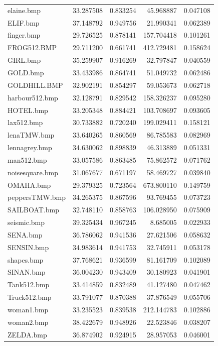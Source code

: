 \documentclass{article}
\begin{document}
\begin{table}[H]
\begin{tabular}{@{}lrrrr@{}}
    elaine.bmp         & 33.287508 & 0.833254 & 45.968887  & 0.047108 \\
    ELIF.bmp           & 37.148792 & 0.949756 & 21.990341  & 0.062389 \\
    finger.bmp         & 29.726525 & 0.878141 & 157.704418 & 0.101261 \\
    FROG512.BMP        & 29.711200 & 0.661741 & 412.729481 & 0.158624 \\
    GIRL.bmp           & 35.259907 & 0.916269 & 32.797847  & 0.040559 \\
    GOLD.bmp           & 33.433986 & 0.864741 & 51.049732  & 0.062486 \\
    GOLDHILL.BMP       & 32.902191 & 0.854297 & 59.053673  & 0.062718 \\
    harbour512.bmp     & 32.128791 & 0.829542 & 158.326237 & 0.095280 \\
    HOTEL.bmp          & 33.205348 & 0.884421 & 103.708697 & 0.093605 \\
    lax512.bmp         & 30.733882 & 0.720240 & 199.029411 & 0.158121 \\
    lenaTMW.bmp        & 33.640265 & 0.860569 & 86.785583  & 0.082969 \\
    lennagrey.bmp      & 34.630062 & 0.898839 & 46.313889  & 0.051331 \\
    man512.bmp         & 33.057586 & 0.863485 & 75.862572  & 0.071762 \\
    noisesquare.bmp    & 31.067677 & 0.671197 & 58.469727  & 0.039840 \\
    OMAHA.bmp          & 29.379325 & 0.723564 & 673.800110 & 0.149759 \\
    peppersTMW.bmp     & 34.265375 & 0.867596 & 93.769455  & 0.073723 \\
    SAILBOAT.bmp       & 32.748110 & 0.858763 & 106.028950 & 0.075909 \\
    seismic.bmp        & 39.325434 & 0.967245 & 8.685005   & 0.022933 \\
    SENA.bmp           & 36.786062 & 0.941536 & 27.621506  & 0.058632 \\
    SENSIN.bmp         & 34.983614 & 0.941753 & 32.745911  & 0.053178 \\
    shapes.bmp         & 37.768621 & 0.936599 & 81.161709  & 0.102089 \\
    SINAN.bmp          & 36.004230 & 0.943409 & 30.180923  & 0.041901 \\
    Tank512.bmp        & 33.414859 & 0.832489 & 41.127480  & 0.047462 \\
    Truck512.bmp       & 33.791077 & 0.870388 & 37.876549  & 0.055706 \\
    woman1.bmp         & 33.235523 & 0.839538 & 212.144783 & 0.102886 \\
    woman2.bmp         & 38.422679 & 0.948926 & 22.523846  & 0.038207 \\
    ZELDA.bmp          & 36.874902 & 0.924915 & 28.957053  & 0.046001 \\
    \bottomrule

  \end{tabular}
\end{table}
\end{document}
